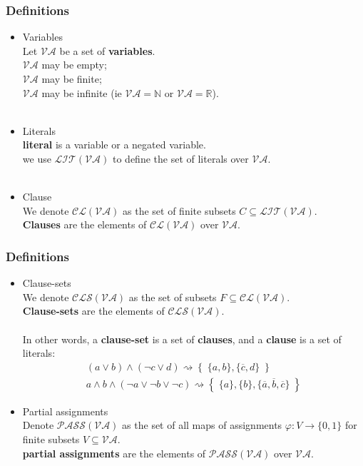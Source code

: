 \documentclass{beamer}
\def\mva{{\mathcal{VA}}}
\def\mpass{{\mathcal{PASS}}}
\def\mpv{{\mpass(\mva)}}
\def\mcl{{\mathcal{CL}}}
\def\mcls{{\mathcal{CLS}}}
\def\mlit{{\mathcal{LIT}}}
\def\pmva{{\pmb{\mathcal{VA}}}}
\def\pmlit{{\pmb{\mathcal{LIT}}}}
\def\pmpv{{\pmb{\mpass(\mva)}}}
\def\pmcl{{\pmb{\mathcal{CL}}}}
\def\pmcls{{\pmb{\mathcal{CLS}}}}
\begin{document}
\begin{frame}
\frametitle{Definitions}
\begin{itemize}
\item Variables \\
Let $\pmva$ be a set of  \textbf{variables}.\\
$\mva$ may be empty;\\
$\mva$ may be finite;\\
$\mva$ may be infinite (ie $\mva = \mathbb{N}$ or $\mva = \mathbb{R}$).
\\~\\
\item Literals \\
\textbf{literal} is a variable or a negated variable.\\
we use $\pmlit(\pmva)$ to define the set of literals over $\mva$.
\\~\\
\item Clause \\
We denote $\pmcl(\pmva)$ as the set of finite subsets $C\subseteq \mlit(\mva)$. \\
\textbf{Clauses} are the elements of $\mcl(\mva)$ over $\mva$.

\end{itemize}
\end{frame}

\begin{frame}
\frametitle{Definitions}
\begin{itemize}
\item Clause-sets \\
We denote $\pmcls(\pmva)$ as the set of subsets $F\subseteq \mcl(\mva)$.\\
\textbf{Clause-sets} are the elements of $\mcls(\mva)$.\\~\\
In other words, a \textbf{clause-set} is a set of \textbf{clauses}, and a \textbf{clause} is a set of literals:
\begin{eqnarray*}
&(a\vee b) \wedge (\neg c\vee d) \rightsquigarrow \left\{ \; \{a,b\}, \{\overline{c}, d\} \; \right\}& \\
& a\wedge b\wedge (\neg a \vee \neg b \vee \neg c) \rightsquigarrow \left\{ \; \{a\},\{b\}, \{\overline{a}, \overline{b}, \overline{c}\} \; \right\}&
\end{eqnarray*}
\item Partial assignments \\
Denote $\pmpv$ as the set of all maps of assignments $\varphi : V \to \{ 0, 1 \}$ for finite subsets $V\subseteq \mva$.\\
\textbf{partial assignments} are the elements of $\mpv$ over $\mva$.
\end{itemize}
\end{frame}
\end{document}
